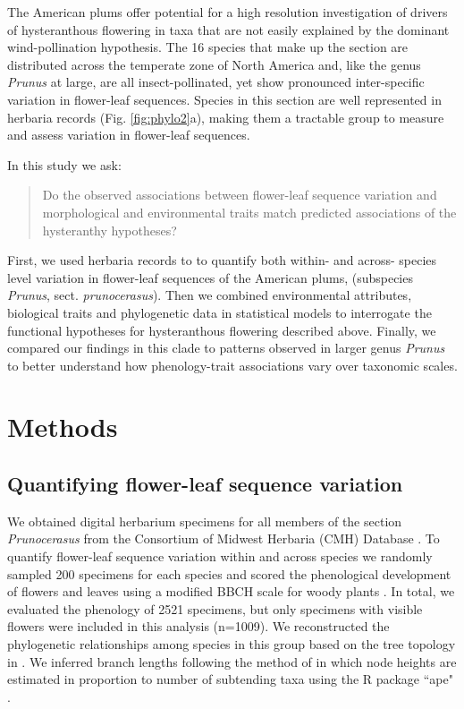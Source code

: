 \documentclass{article}[11pt]
\begin{document}
The American plums offer potential for a high resolution investigation of drivers of hysteranthous flowering in taxa that are not easily explained by the dominant wind-pollination hypothesis. The 16 species that make up the section are distributed across the temperate zone of North America and, like the genus \textit{Prunus} at large, are all insect-pollinated, yet show pronounced inter-specific variation in flower-leaf sequences. Species in this section are well represented in herbaria records (Fig. \ref{fig:phylo2}a), making them a tractable group to measure and assess variation in flower-leaf sequences.

\noindent In this study we ask:

\begin{quote}Do the observed associations between flower-leaf sequence variation and morphological and environmental traits match predicted associations of the hysteranthy hypotheses? \end{quote}

\noindent First, we used herbaria records to to quantify both within- and across- species level variation in flower-leaf sequences of the American plums, (subspecies  \textit{Prunus}, sect. \textit{prunocerasus}).
Then we combined environmental attributes, biological traits and phylogenetic data in statistical models to interrogate the functional hypotheses for hysteranthous flowering described above. Finally, we compared our findings in this clade to patterns observed in larger genus \emph{Prunus} to better understand how phenology-trait associations vary over taxonomic scales.


\section*{Methods}
\subsection{Quantifying flower-leaf sequence variation}  

We obtained digital herbarium specimens for all members of the section \textit{Prunocerasus} from the Consortium of Midwest Herbaria (CMH) Database \citep{CMH}. To quantify flower-leaf sequence variation within and across species we randomly sampled 200 specimens for each species and scored the phenological development of flowers and leaves using a modified BBCH scale for woody plants \citep{Finn2007}. In total, we evaluated the phenology of 2521 specimens, but only specimens with visible flowers were included in this analysis (n=1009). We reconstructed the phylogenetic relationships among species in this group based on the tree topology in \citet{Shaw:2004aa}. We inferred branch lengths following the method of \citet{Granfen1989} in which node heights are estimated in proportion to number of subtending taxa using the R package ``ape" \citep{Paradis2019}.
\end{document}
